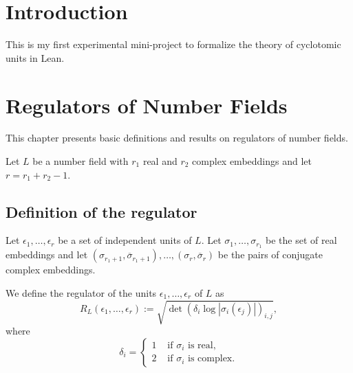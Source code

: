 %

\chapter{Introduction}
This is my first experimental mini-project 
to formalize the theory of cyclotomic units in Lean. 


\chapter{Regulators of Number Fields}
This chapter presents basic definitions and results on regulators of number fields.

Let $L$ be a number field with $r_1$ real and $r_2$ complex embeddings and let $r = r_1 + r_2 - 1$. 

\section{Definition of the regulator}\label{sec:regulator}

Let $\epsilon_1, \dots, \epsilon_r$ be a set of independent units of $L$. Let $\sigma_1, \dots, \sigma_{r_1}$ 
be the set of real embeddings and let $(\sigma_{r_1 + 1}, \overline{\sigma}_{r_1 + 1}), \dots, (\sigma_{r}, \overline{\sigma}_{r})$ be the 
pairs of conjugate complex embeddings.

\begin{defn}\label{defn:regulator}
    We define the regulator of the units $\epsilon_1, \dots, \epsilon_r$ of $L$ as 
    $$
    R_L(\epsilon_1, \dots, \epsilon_r) := \sqrt{\det(\delta_{i} \log | \sigma_i(\epsilon_j) | )_{i, j}}, 
    $$
    where 
    $$
    \delta_i = 
    \begin{cases}
    1 & \text{ if } \sigma_i \text{ is real}, \\
    2 & \text{ if } \sigma_i \text{ is complex}.
    \end{cases}
    $$
\end{defn}


